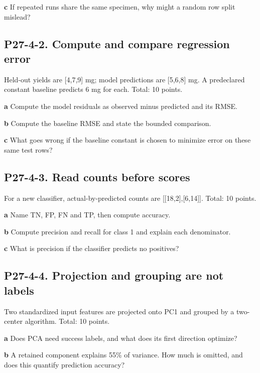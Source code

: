 \documentclass[11pt,letterpaper]{article}
\theoremstyle{definition}\newtheorem{definition}{Definition}\newtheorem{example}{Example}
\numberwithin{equation}{section}
\begin{document}
\textbf{c} If repeated runs share the same specimen, why might a random row split mislead?

\par\noindent\begin{minipage}{\linewidth}
\subsection*{P27-4-2. Compute and compare regression error}
Held-out yields are [4,7,9] mg; model predictions are [5,6,8] mg. A predeclared constant baseline predicts 6 mg for each. Total: 10 points.

\textbf{a} Compute the model residuals as observed minus predicted and its RMSE.

\end{minipage}\par\medskip
\textbf{b} Compute the baseline RMSE and state the bounded comparison.

\textbf{c} What goes wrong if the baseline constant is chosen to minimize error on these same test rows?

\par\noindent\begin{minipage}{\linewidth}
\subsection*{P27-4-3. Read counts before scores}
For a new classifier, actual-by-predicted counts are [[18,2],[6,14]]. Total: 10 points.

\textbf{a} Name TN, FP, FN and TP, then compute accuracy.

\end{minipage}\par\medskip
\textbf{b} Compute precision and recall for class 1 and explain each denominator.

\textbf{c} What is precision if the classifier predicts no positives?

\par\noindent\begin{minipage}{\linewidth}
\subsection*{P27-4-4. Projection and grouping are not labels}
Two standardized input features are projected onto PC1 and grouped by a two-center algorithm. Total: 10 points.

\textbf{a} Does PCA need success labels, and what does its first direction optimize?

\end{minipage}\par\medskip
\textbf{b} A retained component explains 55\% of variance. How much is omitted, and does this quantify prediction accuracy?
\end{document}

